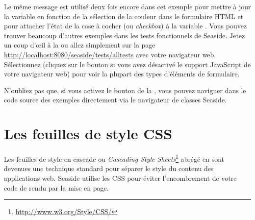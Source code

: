\documentclass[a4paper,10pt,twoside]{book}
\begin{document}
Le même message est utilisé deux fois encore dans cet exemple pour
mettre à jour la variable  en fonction de la sélection de la
couleur dans le formulaire HTML et pour attacher l'état de la case à
cocher (ou \emph{checkbox}) à la variable .
Vous pouvez trouver beaucoup d'autres exemples dans les tests
fonctionnels de Seaside.
Jetez un coup d'\oe{}il à la  %
ou allez simplement sur la page
\url{http://localhost:8080/seaside/tests/alltests} avec votre
navigateur web.
Sélectionnez  
(cliquez sur le bouton  si vous avez
  désactivé le support JavaScript de votre navigateur web) %
 pour voir la plupart des types d'éléments de formulaire.

N'oubliez pas que, si vous activez le bouton  de
la \toolbar, vous pouvez naviguer dans le code source des exemples
directement via le navigateur de classes Seaside. 

\section{Les feuilles de style CSS}


Les feuilles de style en cascade ou 
\emph{Cascading Style
  Sheets}\footnote{\url{http://www.w3.org/Style/CSS/}} abrégé en
  sont devenues une technique standard pour séparer le style
 du contenu des applications web.
Seaside utilise les CSS pour éviter l'encombrement de votre code de
rendu par la mise en page.
\end{document}
